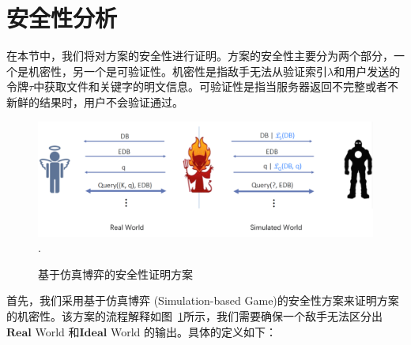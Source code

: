\section{安全性分析}
\label{sec:single-security}
在本节中，我们将对方案的安全性进行证明。方案的安全性主要分为两个部分，一个是机密性，另一个是可验证性。机密性是指敌手无法从验证索引$\lambda$和用户发送的令牌$\tau$中获取文件和关键字的明文信息。可验证性是指当服务器返回不完整或者不新鲜的结果时，用户不会验证通过。
\begin{figure}[t]
\centering
\includegraphics[width=6 in]{fig/security}
\DeclareGraphicsExtensions.
\caption{基于仿真博弈的安全性证明方案}
\label{fig:security}
\end{figure}

首先，我们采用基于仿真博弈 (Simulation-based Game)的安全性方案来证明方案的机密性。该方案的流程解释如图~\ref{fig:security}所示，我们需要确保一个敌手无法区分出$\mathbf{Real}$ World 和$\mathbf{Ideal}$ World 的输出。具体的定义如下：


